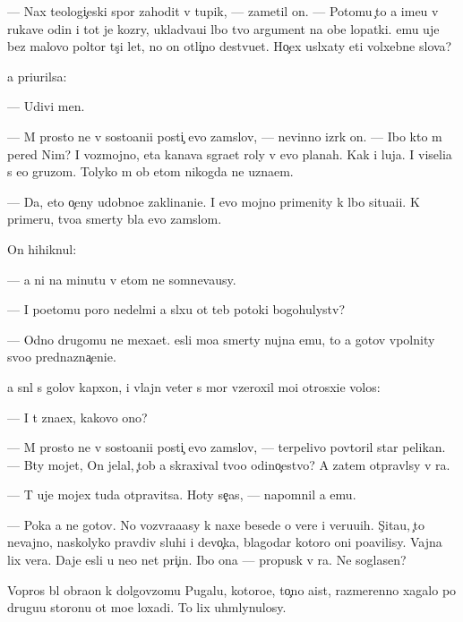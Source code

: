 \documentclass[10pt]{book}
\begin{document}
— Nax teologi{\c}eski{\y} spor zahodit v tupik, — zametil on. — Potomu {\c}to {\y}a ime{\y}u v rukave odin i tot je koz{\yi}ry, uklad{\yi}va{\y}u{\x}i{\y} l{\iu}bo{\y} tvo{\y} argument na obe lopatki. {\Y}emu uje bez malovo poltor{\yi} t{\yi}s{\ia}{\c}i let, no on otli{\c}no de{\y}stvu{\y}et. Ho{\c}ex usl{\yi}xaty eti volxebn{\yi}{\y}e slova?

{\Y}a pri{\x}urilsa:

— Udivi men{\ia}.

— M{\yi} prosto ne v sosto{\y}ani{\y}i posti{\c} {\Y}evo zam{\yi}slov, — nevinno izr{\e}k on. — Ibo kto m{\yi} pered Nim? I vozmojno, eta kanava s{\yi}gra{\y}et roly v {\Y}evo planah. Kak i luja. I viseli{\q}a s {\y}e{\y}o gruzom. Tolyko m{\yi} ob etom nikogda ne uzna{\y}em.

— Da, eto o{\c}eny udobno{\y}e zaklinani{\y}e. I {\y}evo mojno primenity k l{\iu}bo{\y} situa{\q}i{\y}i. K primeru, tvo{\y}a smerty b{\yi}la {\y}evo zam{\yi}slom.

On hihiknul:

— {\Y}a ni na minutu v etom ne somneva{\y}usy.

— I poetomu poro{\y} nedel{\ia}mi {\y}a sl{\yi}xu ot teb{\ia} potoki bogohulystv?

— Odno drugomu ne mexa{\y}et. {\Y}esli mo{\y}a smerty nujna {\Y}emu, to {\y}a gotov v{\yi}polnity svo{\y}o prednazna{\c}eni{\y}e.

{\Y}a sn{\ia}l s golov{\yi} kap{\iu}xon, i vlajn{\yi}{\y} veter s mor{\ia} vz{\y}eroxil mo{\y}i otrosxi{\y}e volos{\yi}:

— I t{\yi} zna{\y}ex, kakovo ono?

— M{\yi} prosto ne v sosto{\y}ani{\y}i posti{\c} {\Y}evo zam{\yi}slov, — terpelivo povtoril star{\yi}{\y} pelikan. — B{\yi}ty mojet, On jelal, {\c}tob{\yi} {\y}a skraxival tvo{\y}o odino{\c}estvo? A zatem otpravl{\iu}sy v ra{\y}.

— T{\yi} uje mojex tuda otpravitsa. Hoty se{\y}{\c}as, — napomnil {\y}a {\y}emu.

— Poka {\y}a ne gotov. No vozvra{\x}a{\y}asy k naxe{\y} besede o vere i veru{\y}u{\x}ih. S{\c}ita{\y}u, {\c}to nevajno, naskolyko pravdiv{\yi} sluhi i devo{\c}ka, blagodar{\ia} kotoro{\y} oni po{\y}avilisy. Vajna lix vera. Daje {\y}esli u ne{\y}o net pri{\c}in{\yi}. Ibo ona — propusk v ra{\y}. Ne soglasen?

Vopros b{\yi}l obra{\x}on k dolgov{\ia}zomu Pugalu, kotoro{\y}e, to{\c}no aist, razmerenno xagalo po drugu{\y}u storonu ot mo{\y}e{\y} loxadi. To lix uhm{\yi}lynulosy.
\end{document}
